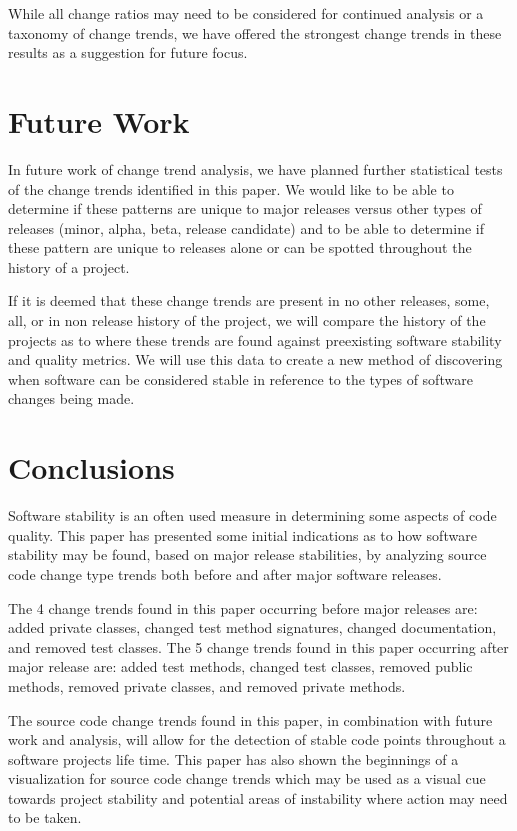 \documentclass[conference]{IEEEtran}
\begin{document}
While all change ratios may need to be considered for continued analysis or a taxonomy of change trends, we have offered the strongest
change trends in these results as a suggestion for future focus.

\section{Future Work}
\label{sec:fut}

In future work of change trend analysis, we have planned further statistical tests of the change trends identified in this paper. We would like to
be able to determine if these patterns are unique to major releases versus other types of releases (minor, alpha, beta, release candidate) and to
be able to determine if these pattern are unique to releases alone or can be spotted throughout the history of a project.

If it is deemed that these change trends are present in no other releases, some, all, or in non release history of the project, we will
compare the history of the projects as to where these trends are found against preexisting software stability and quality metrics. We will use this data to
create a new method of discovering when software can be considered stable in reference to the types of software changes being made. 

\section{Conclusions}
\label{sec:con}

Software stability is an often used measure in determining some aspects of code quality. This paper has presented some initial indications as to how
software stability may be found, based on major release stabilities, by analyzing source code change type trends both before and after major software
releases. 

The 4 change trends found in this paper occurring before major releases are: added private classes, changed test method signatures, changed documentation,
and removed test classes.
The 5 change trends found in this paper occurring after major release are: added test methods, changed test classes, removed public methods, removed
private classes, and removed private methods.

The source code change trends found in this paper, in combination with future work and analysis, will allow for the detection of stable code
points throughout a software projects life time. This paper has also shown the beginnings of a visualization for source code change trends which may
be used as a visual cue towards project stability and potential areas of instability where action may need to be taken.




\end{document}
